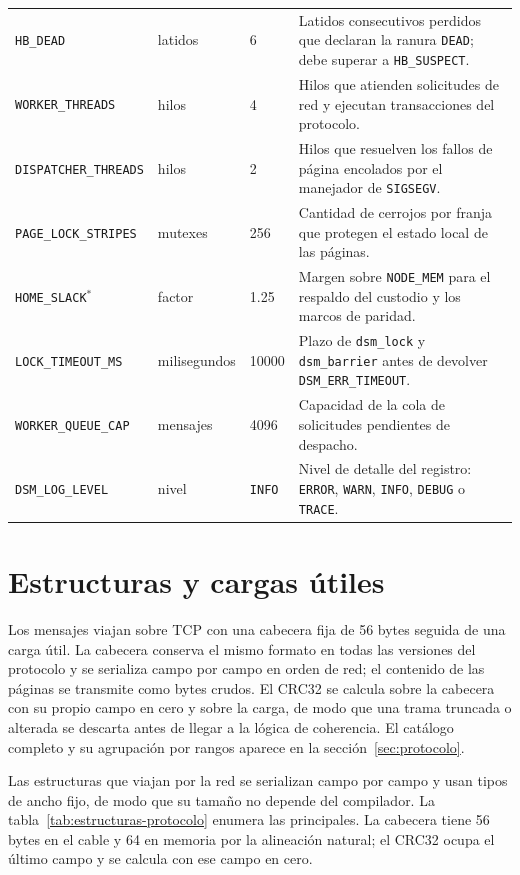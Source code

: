 {\begin{xltabular}{\linewidth}{@{}l l l Y@{}}
\texttt{HB\_DEAD} & latidos & 6 & Latidos consecutivos perdidos que declaran la ranura \texttt{DEAD}; debe superar a \texttt{HB\_SUSPECT}. \\
\texttt{WORKER\_THREADS} & hilos & 4 & Hilos que atienden solicitudes de red y ejecutan transacciones del protocolo. \\
\texttt{DISPATCHER\_THREADS} & hilos & 2 & Hilos que resuelven los fallos de página encolados por el manejador de \texttt{SIGSEGV}. \\
\texttt{PAGE\_LOCK\_STRIPES} & mutexes & 256 & Cantidad de cerrojos por franja que protegen el estado local de las páginas. \\
\texttt{HOME\_SLACK}$^{\ast}$ & factor & 1.25 & Margen sobre \texttt{NODE\_MEM} para el respaldo del custodio y los marcos de paridad. \\
\texttt{LOCK\_TIMEOUT\_MS} & milisegundos & 10000 & Plazo de \texttt{dsm\_lock} y \texttt{dsm\_barrier} antes de devolver \texttt{DSM\_ERR\_TIMEOUT}. \\
\texttt{WORKER\_QUEUE\_CAP} & mensajes & 4096 & Capacidad de la cola de solicitudes pendientes de despacho. \\
\texttt{DSM\_LOG\_LEVEL} & nivel & \texttt{INFO} & Nivel de detalle del registro: \texttt{ERROR}, \texttt{WARN}, \texttt{INFO}, \texttt{DEBUG} o \texttt{TRACE}. \\
\end{xltabular}
}

\section{Estructuras y cargas útiles}\label{app:protocolo}

Los mensajes viajan sobre TCP con una cabecera fija de 56 bytes seguida de una carga útil. La cabecera conserva el mismo formato en todas las versiones del protocolo y se serializa campo por campo en orden de red; el contenido de las páginas se transmite como bytes crudos. El CRC32 se calcula sobre la cabecera con su propio campo en cero y sobre la carga, de modo que una trama truncada o alterada se descarta antes de llegar a la lógica de coherencia. El catálogo completo y su agrupación por rangos aparece en la sección~\ref{sec:protocolo}.

Las estructuras que viajan por la red se serializan campo por campo y usan tipos de ancho fijo, de modo que su tamaño no depende del compilador. La tabla~\ref{tab:estructuras-protocolo} enumera las principales. La cabecera tiene 56 bytes en el cable y 64 en memoria por la alineación natural; el CRC32 ocupa el último campo y se calcula con ese campo en cero.

